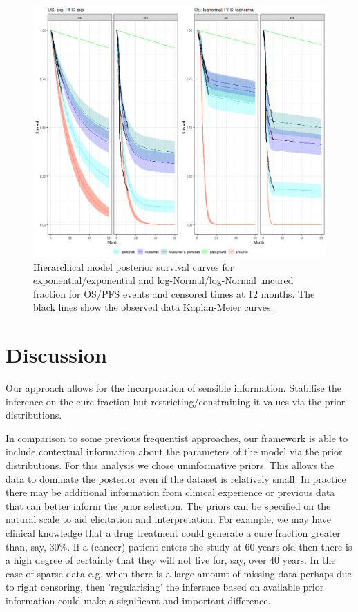\documentclass[AMA,STIX1COL]{WileyNJD-v2}
\begin{document}
\begin{figure}[!H]
\centering
\includegraphics[width=0.6\linewidth]{S_cp_12mo_exp_lognormal_hier.png}
\caption{\label{fig:S_cutpoint_12mo_hier} Hierarchical model posterior survival curves for exponential/exponential and log-Normal/log-Normal uncured fraction for OS/PFS events and censored times at 12 months. The black lines show the observed data Kaplan-Meier curves.}
\end{figure}



\section{Discussion}\label{sec:discussion}

Our approach allows for the incorporation of sensible information.
Stabilise the inference on the cure fraction but restricting/constraining it values via the prior distributions.

In comparison to some previous frequentist approaches, our framework is able to include contextual information about the parameters of the model via the prior distributions.
For this analysis we chose uninformative priors.
This allows the data to dominate the posterior even if the dataset is relatively small.
In practice there may be additional information from clinical experience or previous data that can better inform the prior selection.
The priors can be specified on the natural scale to aid elicitation and interpretation.
For example, we may have clinical knowledge that a drug treatment could generate a cure fraction greater than, say, 30\%.
If a (cancer) patient enters the study at 60 years old then there is a high degree of certainty that they will not live for, say, over 40 years.
In the case of sparse data e.g. when there is a large amount of missing data perhaps due to right censoring, then 'regularising' the inference based on available prior information could make a significant and important difference.
\end{document}

